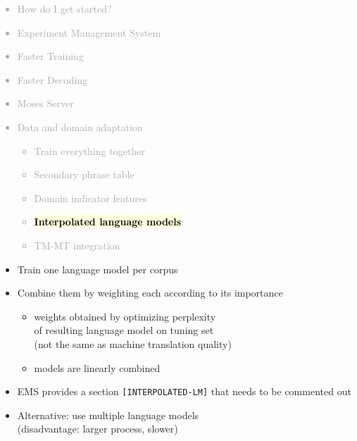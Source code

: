 \documentclass[landscape]{uedslides2C}
\newcommand{\currenttopic}[1]{\colorbox{lightyellow}{\textcolor{black}{\bf #1}}}
\begin{document}

\vspace{-5mm}
\textcolor{darkgrey}{
\begin{itemize} \itemsep -1mm
\item {How do I get started?}
\item {Experiment Management System}
\item {Faster Training}
\item {Faster Decoding}
\item {Moses Server}
\item {Data and domain adaptation}
  \begin{itemize} \vspace{-5mm}
  \item {Train everything together}
  \item {Secondary phrase table}
  \item Domain indicator features
\item \currenttopic{Interpolated language models}
  \item TM-MT integration
  \end{itemize}
\end{itemize}
}


\vspace{5mm}
\begin{itemize} \itemsep 5mm
\item Train one language model per corpus
\item Combine them by weighting each according to its importance
\begin{itemize}
\item weights obtained by optimizing perplexity\\ of resulting language model on tuning set\\
(not the same as machine translation quality) \vspace{2mm}
\item models are linearly combined
\end{itemize}
\item EMS provides a section {\tt [INTERPOLATED-LM]} that needs to be commented out
\item Alternative: use multiple language models\\
(disadvantage: larger process, slower)
\end{itemize}
\end{document}
